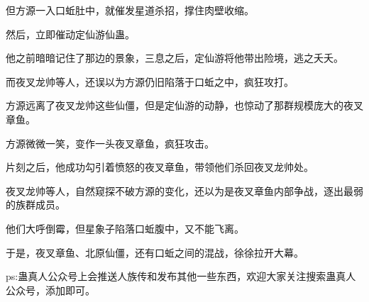 \begin{this_body}
但方源一入口蚯肚中，就催发星道杀招，撑住肉壁收缩。

然后，立即催动定仙游仙蛊。

他之前暗暗记住了那边的景象，三息之后，定仙游将他带出险境，逃之夭夭。

而夜叉龙帅等人，还误以为方源仍旧陷落于口蚯之中，疯狂攻打。

方源远离了夜叉龙帅这些仙僵，但是定仙游的动静，也惊动了那群规模庞大的夜叉章鱼。

方源微微一笑，变作一头夜叉章鱼，疯狂攻击。

片刻之后，他成功勾引着愤怒的夜叉章鱼，带领他们杀回夜叉龙帅处。

夜叉龙帅等人，自然窥探不破方源的变化，还以为是夜叉章鱼内部争战，逐出最弱的族群成员。

他们大呼倒霉，但星象子陷落口蚯腹中，又不能飞离。

于是，夜叉章鱼、北原仙僵，还有口蚯之间的混战，徐徐拉开大幕。

ps:蛊真人公众号上会推送人族传和发布其他一些东西，欢迎大家关注搜索蛊真人公众号，添加即可。

\end{this_body}

